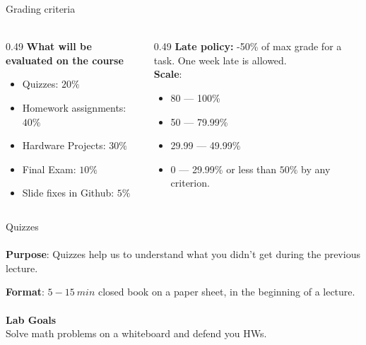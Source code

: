 \documentclass[aspectratio=169]{beamer}
\begin{document}
\begin{frame}[t]{Grading criteria}
    \framesubtitle{}
    \begin{columns}[T,onlytextwidth]
        \begin{column}{0.49\textwidth}
            \textbf{What will be evaluated on the course}
            \begin{itemize}
                \item[Qz:] Quizzes: $20\%$ 
                \item[HWs:] Homework assignments: $40\%$
                \item[HP:] Hardware Projects: $30\%$
                \item[FE:] Final Exam: $10\%$
                \item[Extra:] Slide fixes in Github: $5\%$ 
            \end{itemize}
        \end{column}
        \begin{column}{0.49\textwidth}
            \textbf{Late policy:} -50\% of max grade for a task. One week late is allowed. \\
            \textbf{Scale}:
            \begin{itemize}
                \item[A:] 80 --- 100\%
                \item[B:] 50 --- 79.99\%
                \item[C:] 29.99 --- 49.99\%
                \item[D:] 0 --- 29.99\% or less than $50\%$ by any criterion. 
            \end{itemize}
        \end{column}
    \end{columns}
\end{frame}

\begin{frame}[t]{Quizzes}
    \framesubtitle{}
        \textbf{Purpose}: Quizzes help us to understand what you didn't get during the previous lecture.
        \bigskip

    \textbf{Format}: $5-15\ min$ closed book on a paper sheet, in the beginning of a lecture. \\
    \end{frame}


\begin{frame}[c]{}
    \framesubtitle{}
    \centering \LARGE \textbf{Lab Goals} \\
    Solve math problems on a whiteboard and defend you HWs.
\end{frame}
\end{document}
